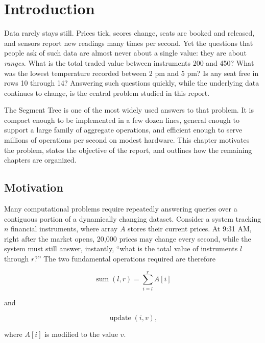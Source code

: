 \documentclass[
  11pt,
  a4paper,
  twoside=false,
  numbers=noenddot,
  headings=big,
  parskip=half,
  toc=bibliography,
  toc=listof,
  bibliography=totoc
]{scrreprt}
\begin{document}
\setcounter{page}{1}
\chapter{Introduction}
\label{ch:intro}

Data rarely stays still. Prices tick, scores change, seats are booked and released, and sensors report new readings many times per second. Yet the questions that people ask of such data are almost never about a single value: they are about \emph{ranges}. What is the total traded value between instruments 200 and 450? What was the lowest temperature recorded between 2 pm and 5 pm? Is any seat free in rows 10 through 14? Answering such questions quickly, while the underlying data continues to change, is the central problem studied in this report.

The Segment Tree is one of the most widely used answers to that problem. It is compact enough to be implemented in a few dozen lines, general enough to support a large family of aggregate operations, and efficient enough to serve millions of operations per second on modest hardware. This chapter motivates the problem, states the objective of the report, and outlines how the remaining chapters are organized.

\section{Motivation}
Many computational problems require repeatedly answering queries over a contiguous portion of a dynamically changing dataset. Consider a system tracking $n$ financial instruments, where array $A$ stores their current prices. At 9:31 AM, right after the market opens, 20{,}000 prices may change every second, while the system must still answer, instantly, ``what is the total value of instruments $l$ through $r$?'' The two fundamental operations required are therefore

\begin{equation}
\operatorname{sum}(l,r) = \sum_{i=l}^{r} A[i]
\label{eq:sum}
\end{equation}

and

\begin{equation}
\operatorname{update}(i,v),
\label{eq:update}
\end{equation}

where $A[i]$ is modified to the value $v$.
\end{document}
